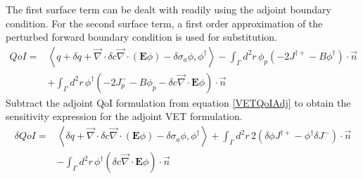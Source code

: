 \documentclass{article}
\newcommand{\bra}{\left\langle}
\newcommand{\ket}{\right\rangle}
\newcommand{\vdiv}{\vec{\nabla} \cdot}
\newcommand{\Edd}{\mathbf{E}}
\newcommand{\siga}{\sigma_a}
\newcommand{\isigt}{c}
\newcommand{\scalSource}{q}
\begin{document}
The first surface term can be dealt with readily using the adjoint boundary condition. For the second surface term, a first order approximation of the perturbed forward boundary condition is used for substitution.
\begin{equation}
\label{QoIVETAdj}
\begin{split}
QoI =& \bra \scalSource + \delta \scalSource + \vdiv \delta \isigt \vdiv \left( \Edd \phi \right) - \delta \siga \phi, \phi^\dag \ket - \int_\Gamma d^2 r \, \phi_p \left( - 2J^{\dag +} - B \phi^\dag \right) \cdot \vec{n} 
\\ &+ \int_\Gamma d^2 r \, \phi^\dag \left( - 2J_p^- - B \phi_p - \delta \isigt \vdiv \Edd \phi \right) \cdot \vec{n} 
\end{split}
\end{equation}
Subtract the adjoint QoI formulation from equation \ref{VETQoIAdj} to obtain the sensitivity expression for the adjoint VET formulation.
\begin{equation}
\label{SensVETAdjNoBC}
\begin{split}
\delta QoI =& \bra \delta \scalSource + \vdiv \delta \isigt \vdiv \left( \Edd \phi \right) - \delta \siga \phi, \phi^\dag \ket + \int_\Gamma d^2 r \, 2  \left( \delta \phi J^{\dag +}  - \phi^\dag \delta J^- \right) \cdot \vec{n}
\\ &- \int_\Gamma d^2 r \,  \phi^\dag \left( \delta \isigt \vdiv \Edd \phi \right) \cdot \vec{n} 
\end{split}
\end{equation}
\end{document}
